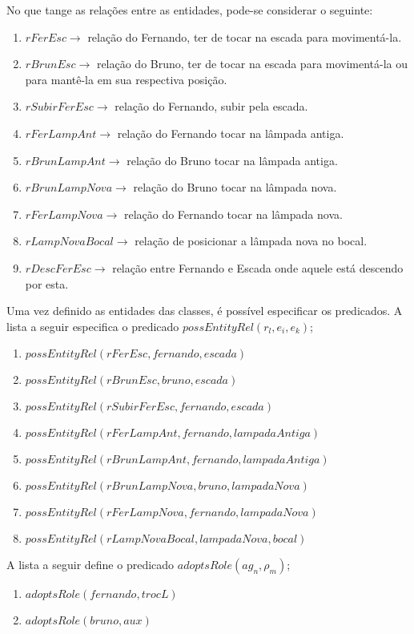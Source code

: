 No que tange as relações entre as entidades, pode-se considerar o seguinte: 

\begin{enumerate}
	\item $rFerEsc \to$ relação do Fernando, ter de tocar na escada para movimentá-la. 
	\item $rBrunEsc \to$ relação do Bruno, ter de tocar na escada para movimentá-la ou para mantê-la em sua respectiva posição.
	\item $rSubirFerEsc \to$ relação do Fernando, subir pela escada.
	\item $rFerLampAnt \to$ relação do Fernando tocar na lâmpada antiga. 
	\item $rBrunLampAnt \to$ relação do Bruno tocar na lâmpada antiga.
	\item $rBrunLampNova \to$ relação do Bruno tocar na lâmpada nova.
	\item $rFerLampNova \to$ relação do Fernando tocar na lâmpada nova.
	\item $rLampNovaBocal \to$  relação de posicionar a lâmpada nova no bocal. 	
	\item $rDescFerEsc \to$ relação entre Fernando e Escada onde aquele está descendo por esta.
\end{enumerate}


Uma vez definido as entidades das classes, é possível especificar os predicados. A lista a seguir especifica o predicado $possEntityRel(r_l,e_i,e_k)$;

\begin{enumerate}
	\item $possEntityRel(rFerEsc,fernando,escada)$
	\item $possEntityRel(rBrunEsc,bruno,escada)$
	\item $possEntityRel(rSubirFerEsc,fernando,escada)$
	\item $possEntityRel(rFerLampAnt,fernando,lampadaAntiga)$
	\item $possEntityRel(rBrunLampAnt,fernando,lampadaAntiga)$
	\item $possEntityRel(rBrunLampNova,bruno,lampadaNova)$
	\item $possEntityRel(rFerLampNova,fernando,lampadaNova)$
	\item $possEntityRel(rLampNovaBocal,lampadaNova,bocal)$
\end{enumerate}

A lista a seguir define o predicado $adoptsRole(ag_n,\rho_m)$;

\begin{enumerate}
	\item $adoptsRole(fernando,trocL)$
	\item $adoptsRole(bruno,aux)$
\end{enumerate}

